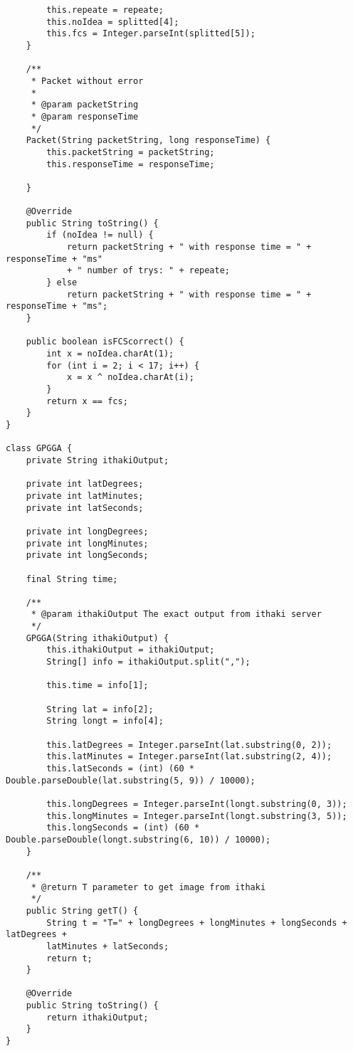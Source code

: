 \documentclass{article}
\begin{document}
\begin{verbatim}
        this.repeate = repeate;
        this.noIdea = splitted[4];
        this.fcs = Integer.parseInt(splitted[5]);
    }

    /**
     * Packet without error
     *
     * @param packetString
     * @param responseTime
     */
    Packet(String packetString, long responseTime) {
        this.packetString = packetString;
        this.responseTime = responseTime;

    }

    @Override
    public String toString() {
        if (noIdea != null) {
            return packetString + " with response time = " + responseTime + "ms"
            + " number of trys: " + repeate;
        } else
            return packetString + " with response time = " + responseTime + "ms";
    }

    public boolean isFCScorrect() {
        int x = noIdea.charAt(1);
        for (int i = 2; i < 17; i++) {
            x = x ^ noIdea.charAt(i);
        }
        return x == fcs;
    }
}

class GPGGA {
    private String ithakiOutput;

    private int latDegrees;
    private int latMinutes;
    private int latSeconds;

    private int longDegrees;
    private int longMinutes;
    private int longSeconds;

    final String time;

    /**
     * @param ithakiOutput The exact output from ithaki server
     */
    GPGGA(String ithakiOutput) {
        this.ithakiOutput = ithakiOutput;
        String[] info = ithakiOutput.split(",");

        this.time = info[1];

        String lat = info[2];
        String longt = info[4];

        this.latDegrees = Integer.parseInt(lat.substring(0, 2));
        this.latMinutes = Integer.parseInt(lat.substring(2, 4));
        this.latSeconds = (int) (60 * Double.parseDouble(lat.substring(5, 9)) / 10000);

        this.longDegrees = Integer.parseInt(longt.substring(0, 3));
        this.longMinutes = Integer.parseInt(longt.substring(3, 5));
        this.longSeconds = (int) (60 * Double.parseDouble(longt.substring(6, 10)) / 10000);
    }

    /**
     * @return T parameter to get image from ithaki
     */
    public String getT() {
        String t = "T=" + longDegrees + longMinutes + longSeconds + latDegrees +
        latMinutes + latSeconds;
        return t;
    }

    @Override
    public String toString() {
        return ithakiOutput;
    }
}
\end{verbatim}
\end{document}
